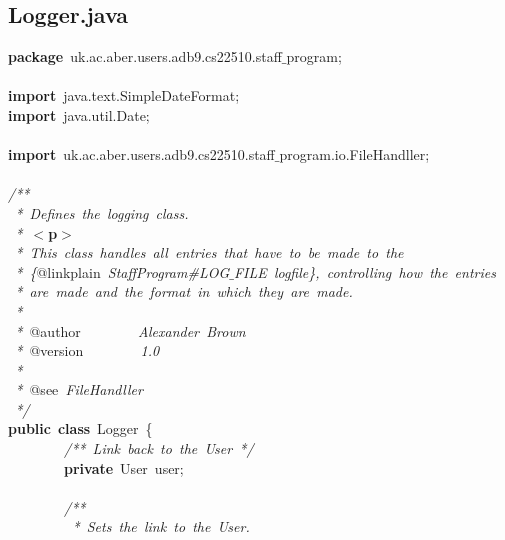 \clearpage
\normalsize
\rmfamily
\subsection{Logger.java}
\scriptsize
\sffamily
\noindent
\mbox{}\textbf{package}\ uk.ac.aber.users.adb9.cs22510.staff$\_$program; \\
\mbox{} \\
\mbox{}\textbf{import}\ java.text.SimpleDateFormat; \\
\mbox{}\textbf{import}\ java.util.Date; \\
\mbox{} \\
\mbox{}\textbf{import}\ uk.ac.aber.users.adb9.cs22510.staff$\_$program.io.FileHandller; \\
\mbox{} \\
\mbox{}\textit{/**} \\
\mbox{}\textit{\ *\ Defines\ the\ logging\ class.} \\
\mbox{}\textit{\ *\ }\textbf{$<$p$>$} \\
\mbox{}\textit{\ *\ This\ class\ handles\ all\ entries\ that\ have\ to\ be\ made\ to\ the} \\
\mbox{}\textit{\ *\ \{}@linkplain\textit{\ StaffProgram\#LOG$\_$FILE\ logfile\},\ controlling\ how\ the\ entries} \\
\mbox{}\textit{\ *\ are\ made\ and\ the\ format\ in\ which\ they\ are\ made.} \\
\mbox{}\textit{\ *} \\
\mbox{}\textit{\ *\ }@author\textit{\ \ \ \ \ \ \ \ Alexander\ Brown} \\
\mbox{}\textit{\ *\ }@version\textit{\ \ \ \ \ \ \ \ 1.0} \\
\mbox{}\textit{\ *} \\
\mbox{}\textit{\ *\ }@see\textit{\ FileHandller} \\
\mbox{}\textit{\ */} \\
\mbox{}\textbf{public}\ \textbf{class}\ Logger\ \{ \\
\mbox{}\ \ \ \ \ \ \ \ \textit{/**\ Link\ back\ to\ the\ User\ */} \\
\mbox{}\ \ \ \ \ \ \ \ \textbf{private}\ User\ user; \\
\mbox{}\ \ \ \ \ \ \ \  \\
\mbox{}\ \ \ \ \ \ \ \ \textit{/**} \\
\mbox{}\textit{\ \ \ \ \ \ \ \ \ *\ Sets\ the\ link\ to\ the\ User.} \\
